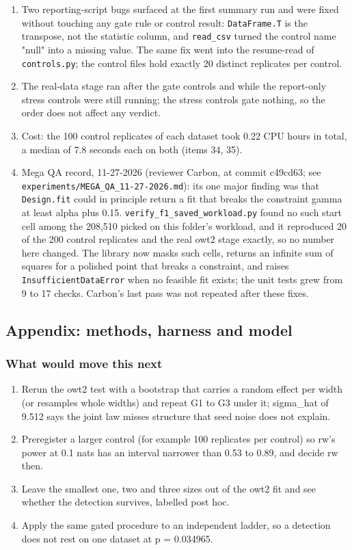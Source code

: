 \begin{enumerate}
  \item Two reporting-script bugs surfaced at the first summary run and were fixed without touching any gate rule or control result: \texttt{DataFrame.T} is the transpose, not the statistic column, and \texttt{read\_\allowbreak{}csv} turned the control name "null" into a missing value. The same fix went into the resume-read of \texttt{controls.py}; the control files hold exactly 20 distinct replicates per control.
  \item The real-data stage ran after the gate controls and while the report-only stress controls were still running; the stress controls gate nothing, so the order does not affect any verdict.
  \item Cost: the 100 control replicates of each dataset took 0.22 CPU hours in total, a median of 7.8 seconds each on both (items 34, 35).
  \item Mega QA record, 11-27-2026 (reviewer Carbon, at commit c49cd63; see \texttt{experiments/\allowbreak{}MEGA\_\allowbreak{}QA\_\allowbreak{}11-27-2026.md}): its one major finding was that \texttt{Design.fit} could in principle return a fit that breaks the constraint gamma at least alpha plus 0.15. \texttt{verify\_\allowbreak{}f1\_\allowbreak{}saved\_\allowbreak{}workload.py} found no such start cell among the 208,510 picked on this folder's workload, and it reproduced 20 of the 200 control replicates and the real owt2 stage exactly, so no number here changed. The library now masks such cells, returns an infinite sum of squares for a polished point that breaks a constraint, and raises \texttt{InsufficientDataError} when no feasible fit exists; the unit tests grew from 9 to 17 checks. Carbon's last pass was not repeated after these fixes.
\end{enumerate}


\subsection*{Appendix: methods, harness and model}
\subsubsection*{What would move this next}

\begin{enumerate}
  \item Rerun the owt2 test with a bootstrap that carries a random effect per width (or resamples whole widths) and repeat G1 to G3 under it; sigma\_hat of 9.512 says the joint law misses structure that seed noise does not explain.
  \item Preregister a larger control (for example 100 replicates per control) so rw's power at 0.1 nats has an interval narrower than 0.53 to 0.89, and decide rw then.
  \item Leave the smallest one, two and three sizes out of the owt2 fit and see whether the detection survives, labelled post hoc.
  \item Apply the same gated procedure to an independent ladder, so a detection does not rest on one dataset at p = 0.034965.
\end{enumerate}

